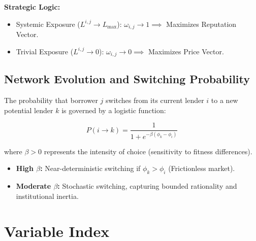 \documentclass{article}
\begin{document}
\noindent \textbf{Strategic Logic:} 
\begin{itemize}
    \item Systemic Exposure ($L^{i,j} \to L_{\max}$): $\omega_{i,j} \to 1 \implies$ Maximizes Reputation Vector.
    \item Trivial Exposure ($L^{i,j} \to 0$): \hspace{1.5cm} $\omega_{i,j} \to 0 \implies$ Maximizes Price Vector.
\end{itemize}

\subsection{Network Evolution and Switching Probability}

\noindent The probability that borrower $j$ switches from its current lender $i$ to a new potential lender $k$ is governed by a logistic function:

\begin{equation}
    P(i \to k) = \frac{1}{1 + e^{-\beta(\phi_k - \phi_i)}}
\end{equation}

\noindent where $\beta > 0$ represents the intensity of choice (sensitivity to fitness differences). 

\begin{itemize}
    \item \textbf{High $\beta$:} Near-deterministic switching if $\phi_k > \phi_i$ (Frictionless market).
    \item \textbf{Moderate $\beta$:} Stochastic switching, capturing bounded rationality and institutional inertia.
\end{itemize}

\section{Variable Index}
\end{document}
